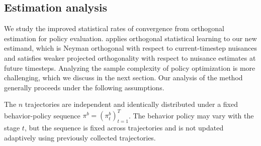 \documentclass[opre,nonblindrev]{informs4}
\begin{document}
\subsection{Estimation analysis }\label{sec-analysis}
{We study the improved statistical rates of convergence from orthogonal estimation for policy evaluation.  applies orthogonal statistical learning to our new estimand, which is Neyman orthogonal with respect to current-timestep nuisances and satisfies weaker projected orthogonality with respect to nuisance estimates at future timesteps. Analyzing the sample complexity of policy optimization is more challenging, which we discuss in the next section. } 
Our analysis of the method generally proceeds under the following assumptions.
\begin{assumption}\label{asn-iid-trajs}
The $n$ trajectories are independent and identically distributed under a
fixed behavior-policy sequence
$\pi^b=(\pi_t^b)_{t=1}^T$. The behavior policy may vary with the stage
$t$, but the sequence is fixed across trajectories and is not updated
adaptively using previously collected trajectories.
\end{assumption}
\end{document}
